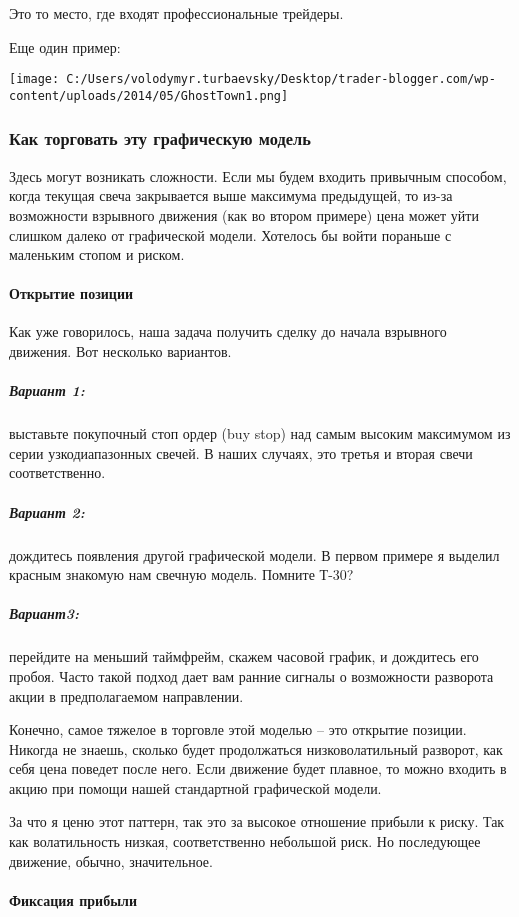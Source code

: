 \documentclass[a5paper]{article}
\begin{document}
Это то место, где входят профессиональные трейдеры.

Еще один пример:

\texttt{[image: C:/Users/volodymyr.turbaevsky/Desktop/trader-blogger.com/wp-content/uploads/2014/05/GhostTown1.png]}

\subsubsection{Как торговать эту графическую модель}

Здесь могут возникать сложности. Если мы будем входить привычным способом, когда текущая свеча закрывается выше максимума предыдущей, то из-за возможности взрывного движения (как во втором примере) цена может уйти слишком далеко от графической модели. Хотелось бы войти пораньше с маленьким стопом и риском.

\paragraph{Открытие позиции}

Как уже говорилось, наша задача получить сделку до начала взрывного движения. Вот несколько вариантов.

\subparagraph{Вариант 1:} выставьте покупочный стоп ордер (buy stop) над самым высоким максимумом из серии узкодиапазонных свечей. В наших случаях, это третья и вторая свечи соответственно.

\subparagraph{Вариант 2:} дождитесь появления другой графической модели. В первом примере я выделил красным знакомую нам свечную модель. Помните Т-30?

\subparagraph{Вариант3:} перейдите на меньший таймфрейм, скажем часовой график, и дождитесь его пробоя. Часто такой подход дает вам ранние сигналы о возможности разворота акции в предполагаемом направлении.

Конечно, самое тяжелое в торговле этой моделью – это открытие позиции. Никогда не знаешь, сколько будет продолжаться низковолатильный разворот, как себя цена поведет после него. Если движение будет плавное, то можно входить в акцию при помощи нашей стандартной графической модели.

За что я ценю этот паттерн, так это за высокое отношение прибыли к
риску. Так как волатильность низкая, соответственно небольшой риск. Но
последующее движение, обычно, значительное.

\paragraph{Фиксация прибыли}
\end{document}
